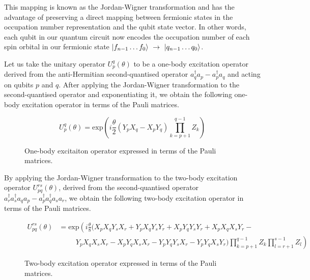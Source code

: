This mapping is known as the Jordan-Wigner transformation \cite{Seeley2020} and has the advantage of preserving a direct mapping between fermionic states in the occupation number representation and the qubit state vector. In other words, each qubit in our quantum circuit now encodes the occupation number of each spin orbital in our fermionic state $\ket{f_{n-1} \dots f_{0}} \,\,\rightarrow\,\, \ket{q_{n-1} \dots q_{0}}$.

Let us take the unitary operator $U^q_p(\theta)$ to be a one-body excitation operator derived from the anti-Hermitian second-quantised operator $a_q^\dagger a_p - a_p^\dagger a_q$ and acting on qubits $p$ and $q$. After applying the Jordan-Wigner transformation to the second-quantised operator and exponentiating it, we obtain the following one-body excitation operator in terms of the Pauli matrices.

\begin{figure}[H]
    \centering
    \begin{equation*}
        U^q_p (\theta) =
        \text{exp} \left( i
        \frac{\theta}{2} (Y_p X_q - X_p Y_q) \prod_{k=p+1}^{q-1} Z_k \right)
    \end{equation*}
    \caption{One-body excitaiton operator expressed in terms of the Pauli matrices.}
\end{figure}

By applying the Jordan-Wigner transformation to the two-body excitation operator $U^{rs}_{pq}(\theta)$, derived from the second-quantised operator $a_r^\dagger a_s^\dagger a_q a_p - a_p^\dagger a_q^\dagger a_s a_r$, we obtain the following two-body excitation operator in terms of the Pauli matrices.

\begin{figure}[H]
    \centering
    \begin{align*}
        U^{rs}_{pq} (\theta) &= \text{exp} \left( i \frac{\theta}{8} (
        X_p X_q Y_s X_r +
        Y_p X_q Y_s Y_r +
        X_p Y_q Y_s Y_r +
        X_p X_q X_s Y_r - \right. \\
        &\left. \hspace{1cm} 
        Y_p X_q X_s X_r -
        X_p Y_q X_s X_r -
        Y_p Y_q Y_s X_r -
        Y_p Y_q X_s Y_r )
        \prod_{k=p+1}^{q-1} Z_k
        \prod_{l=r+1}^{s-1} Z_l
        \right)
    \end{align*}
    \caption{Two-body excitation operator expressed in terms of the Pauli matrices.}
\end{figure}

